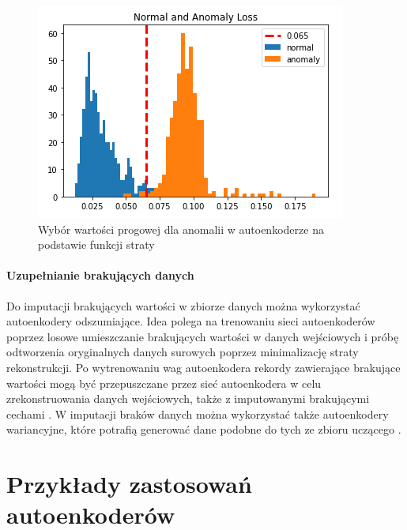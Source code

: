 \documentclass[12pt]{mwbk}
\theoremstyle{plain}
\theoremstyle{definition}
\theoremstyle{remark}
\newcommand\zrodlo[1]{\par\vspace{-3mm}{\small\textit{Źródło: }#1 }}
\begin{document}
 \begin{figure}[!h]
 	\centering
 	\includegraphics[width=0.7\linewidth]{rys/anomaly_loss.png}
 	\caption{Wybór wartości progowej dla anomalii w autoenkoderze na podstawie funkcji straty}
 	\zrodlo{\cite{agrawal}}
 	\label{fig:anomaly_loss}
 \end{figure}

\newpage

\subsubsection{Uzupełnianie brakujących danych}

Do imputacji brakujących wartości w zbiorze danych można wykorzystać autoenkodery odszumiające. Idea polega na trenowaniu sieci autoenkoderów poprzez losowe umieszczanie brakujących wartości w danych wejściowych i próbę odtworzenia oryginalnych danych surowych poprzez minimalizację straty rekonstrukcji. Po wytrenowaniu wag autoenkodera rekordy zawierające brakujące wartości mogą być przepuszczane przez sieć autoenkodera w celu zrekonstruowania danych wejściowych, także z imputowanymi brakującymi cechami \cite{kumar}. W imputacji braków danych można wykorzystać także autoenkodery wariancyjne, które potrafią generować dane podobne do tych ze zbioru uczącego \cite{mccoy}.


\chapter{Przykłady zastosowań autoenkoderów}

\end{document}
